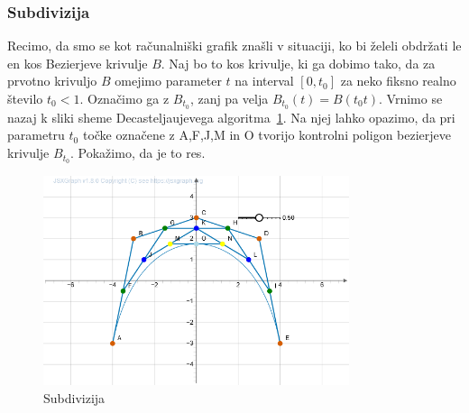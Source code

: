 \documentclass[isrm2, tisk]{fmfdelo}
\begin{document}
    \subsubsection{Subdivizija}
    Recimo, da smo se kot računalniški grafik znašli v situaciji, ko bi želeli obdržati le en kos Bezierjeve krivulje $B$.
    Naj bo to kos krivulje, ki ga dobimo tako, da za prvotno krivuljo $B$ omejimo parameter $t$ na interval $[0,t_0]$ za neko fiksno realno število $t_0<1$.
    Označimo ga z $B_{t_0}$, zanj pa velja $B_{t_0}(t)=B(t_{0}t)$.
    Vrnimo se nazaj k sliki sheme Decasteljaujevega algoritma~\ref{fig:subdivizija}.
    Na njej lahko opazimo, da pri parametru $t_0$ točke označene z A,F,J,M in O tvorijo kontrolni poligon bezierjeve krivulje $B_{t_0}$.
    Pokažimo, da je to res.
    \begin{figure}[h!]
        \centering
        \includegraphics[width=0.8\textwidth]{images/subidivizja.png}
        \caption{Subdivizija}
        \label{fig:subdivizija}
    \end{figure}
\end{document}
